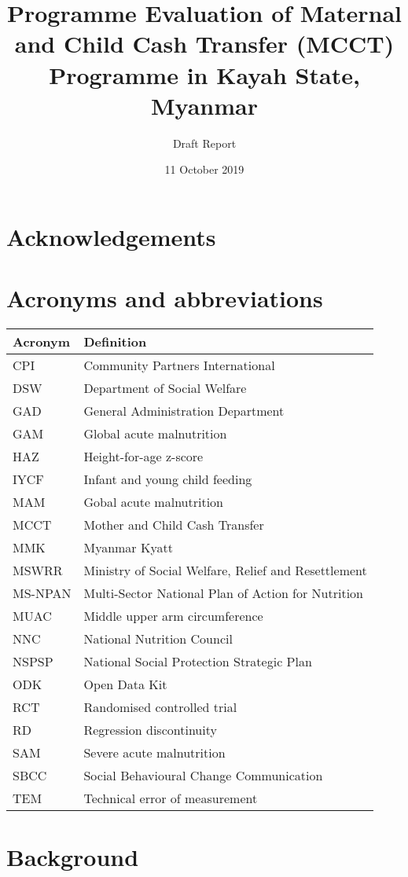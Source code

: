 \documentclass[12pt,a4paper]{article}
\title{\vspace{8cm} \LARGE{Programme Evaluation of Maternal and Child Cash Transfer (MCCT) Programme in Kayah State, Myanmar}}
\subtitle{Draft Report}
\author{}
\date{11 October 2019}
\begin{document}
\maketitle

\newpage

{
\hypersetup{linkcolor=black}
\setcounter{tocdepth}{3}
\tableofcontents
}
\listoftables
\listoffigures
\newpage

\hypertarget{acknowledgements}{%
\section*{Acknowledgements}\label{acknowledgements}}

\newpage

\hypertarget{acronyms-and-abbreviations}{%
\section*{Acronyms and abbreviations}\label{acronyms-and-abbreviations}}

\begin{longtable}[]{@{}ll@{}}
\toprule
Acronym & Definition\tabularnewline
\midrule
\endhead
CPI & Community Partners International\tabularnewline
DSW & Department of Social Welfare\tabularnewline
GAD & General Administration Department\tabularnewline
GAM & Global acute malnutrition\tabularnewline
HAZ & Height-for-age z-score\tabularnewline
IYCF & Infant and young child feeding\tabularnewline
MAM & Gobal acute malnutrition\tabularnewline
MCCT & Mother and Child Cash Transfer\tabularnewline
MMK & Myanmar Kyatt\tabularnewline
MSWRR & Ministry of Social Welfare, Relief and Resettlement\tabularnewline
MS-NPAN & Multi-Sector National Plan of Action for Nutrition\tabularnewline
MUAC & Middle upper arm circumference\tabularnewline
NNC & National Nutrition Council\tabularnewline
NSPSP & National Social Protection Strategic Plan\tabularnewline
ODK & Open Data Kit\tabularnewline
RCT & Randomised controlled trial\tabularnewline
RD & Regression discontinuity\tabularnewline
SAM & Severe acute malnutrition\tabularnewline
SBCC & Social Behavioural Change Communication\tabularnewline
TEM & Technical error of measurement\tabularnewline
\bottomrule
\end{longtable}

\newpage

\hypertarget{background}{%
\section{Background}\label{background}}
\end{document}
